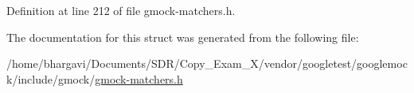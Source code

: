 Definition at line 212 of file gmock-\/matchers.\+h.



The documentation for this struct was generated from the following file\+:\begin{DoxyCompactItemize}
\item 
/home/bhargavi/\+Documents/\+S\+D\+R/\+Copy\+\_\+\+Exam\+\_\+X/vendor/googletest/googlemock/include/gmock/\hyperlink{gmock-matchers_8h}{gmock-\/matchers.\+h}\end{DoxyCompactItemize}
